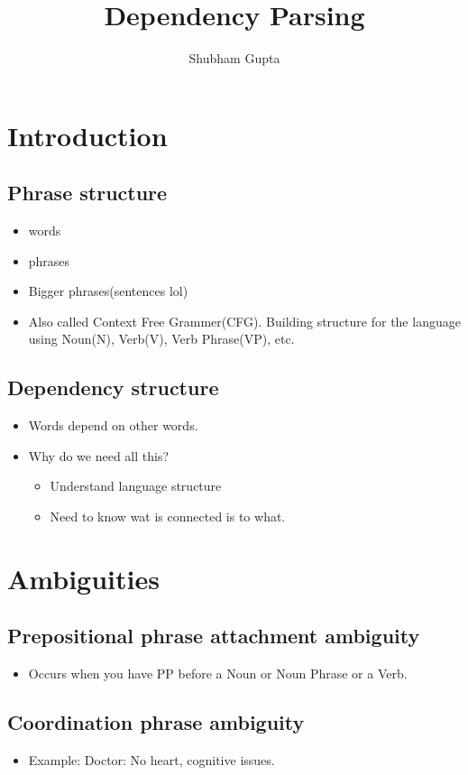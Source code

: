 \documentclass[a4paper]{article}
\title{Dependency Parsing}
\author{Shubham Gupta}
\begin{document}
\maketitle
\section{Introduction}
\subsection{Phrase structure}
\begin{itemize}
    \item words
    \item phrases
    \item Bigger phrases(sentences lol)
    \item Also called Context Free Grammer(CFG). Building structure for the language using Noun(N), Verb(V), Verb Phrase(VP), etc.
\end{itemize}
\subsection{Dependency structure}
\begin{itemize}
    \item Words depend on other words.
    \item Why do we need all this?
        \begin{itemize}
            \item Understand language structure
            \item Need to know wat is connected is to what.
        \end{itemize}
\end{itemize}

\section{Ambiguities}
\subsection{Prepositional phrase attachment ambiguity}
\begin{itemize}
    \item Occurs when you have PP before a Noun or Noun Phrase or a Verb.
\end{itemize}
\subsection{Coordination phrase ambiguity}
\begin{itemize}
    \item Example: Doctor: No heart, cognitive issues.
\end{itemize}
\end{document}
